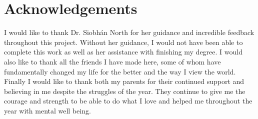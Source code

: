 \chapter*{\Large \center Acknowledgements}

I would like to thank Dr. Siobhán North for her guidance and incredible feedback throughout this project. Without her guidance, I would not have been able to complete this work as well as her assistance with finishing my degree. I would also like to thank all the friends I have made here, some of whom have fundamentally changed my life for the better and the way I view the world. Finally I would like to thank both my parents for their continued support and believing in me despite the struggles of the year. They continue to give me the courage and strength to be able to do what I love and helped me throughout the year with mental well being.